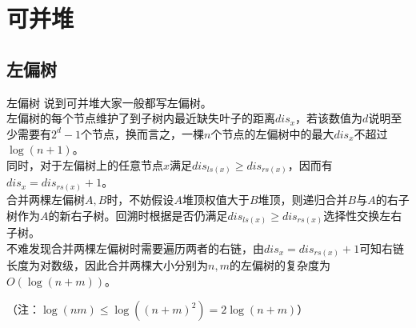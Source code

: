 \documentclass{beamer}
\begin{document}
\section{可并堆}
\subsection{左偏树}
\begin{frame}{左偏树}
说到可并堆大家一般都写左偏树。\\

左偏树的每个节点维护了到子树内最近缺失叶子的距离$dis_x$，若该数值为$d$说明至少需要有$2^d-1$个节点，换而言之，一棵$n$个节点的左偏树中的最大$dis_x$不超过$\log(n+1)$。\\

同时，对于左偏树上的任意节点$x$满足$dis_{ls(x)}\ge dis_{rs(x)}$，因而有$dis_x=dis_{rs(x)}+1$。\\

合并两棵左偏树$A,B$时，不妨假设$A$堆顶权值大于$B$堆顶，则递归合并$B$与$A$的右子树作为$A$的新右子树。回溯时根据是否仍满足$dis_{ls(x)}\ge dis_{rs(x)}$选择性交换左右子树。\\

不难发现合并两棵左偏树时需要遍历两者的右链，由$dis_x=dis_{rs(x)}+1$可知右链长度为对数级，因此合并两棵大小分别为$n,m$的左偏树的复杂度为$O(\log(n+m))$。

（注：$\log(nm) \le \log((n+m)^2) = 2\log(n+m)$）

\end{frame}
\end{document}
